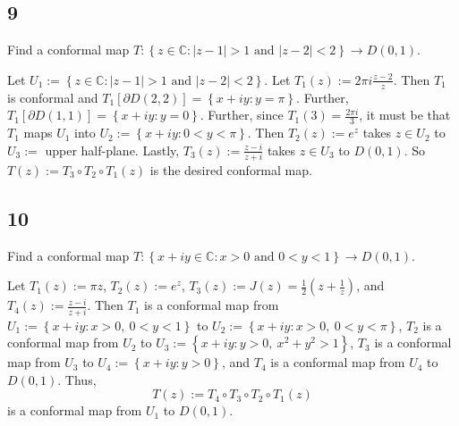 \documentclass[12pt]{article}
\begin{document}
\subsection*{9}
\begin{tcolorbox}
  Find a conformal map $T : \left\{ z \in \mathbb{C} : |z - 1| > 1 \text{ and } |z - 2| < 2 \right\} \rightarrow D(0,1)$.
\end{tcolorbox}
Let $U_1 := \left\{ z \in \mathbb{C} : |z - 1| > 1 \text{ and } |z - 2| < 2 \right\}$. 
Let $T_1(z) := 2\pi i\frac{z - 2}{z}$. Then $T_1$ is conformal and $T_1[\partial D(2,2)] = \left\{ x + iy : y = \pi \right\}$. Further,
$T_1[\partial D(1,1)] = \left\{ x + iy : y = 0 \right\}$. Further, since $T_1(3) = \frac{2\pi i}{3}$, it must be that $T_1$ maps $U_1$ into 
$U_2 := \left\{ x + iy : 0 < y < \pi \right\}$. Then $T_2(z) := e^{z}$ takes $z \in U_2$ to $U_3 :=$ upper half-plane. Lastly, $T_3(z) := \frac{z -
i}{z + i}$ takes $z \in U_3$ to $D(0,1)$. So $T(z) := T_3 \circ T_2 \circ T_1(z)$ is the desired conformal map.


\subsection*{10}
\begin{tcolorbox}
  Find a conformal map $T : \left\{ x + iy \in \mathbb{C} : x > 0 \text{ and } 0 < y < 1 \right\} \rightarrow D(0,1)$.
\end{tcolorbox}
Let $T_1(z) := \pi z$, $T_2(z) := e^{z}$, $T_3(z) := J(z) = \frac{1}{2}\left(z + \frac{1}{z}\right)$, and $T_4(z) := \frac{z - i}{z + i}$. Then $T_1$
is a conformal map from $U_1 := \left\{ x + iy : x > 0,\  0 < y < 1 \right\}$ to $U_2 := \left\{ x + iy : x > 0,\  0 < y < \pi \right\}$, $T_2$ is a
conformal map from $U_2$ to $U_3 := \left\{ x + iy : y > 0,\  x^2 + y^2 > 1 \right\}$, $T_3$ is a conformal map from $U_3$ to 
$U_4 := \left\{ x + iy : y > 0 \right\}$, and $T_4$ is a conformal map from $U_4$ to $D(0,1)$. Thus,
\[ T(z) := T_4 \circ T_3 \circ T_2 \circ T_1(z) \]
is a conformal map from $U_1$ to $D(0,1)$.
\end{document}
